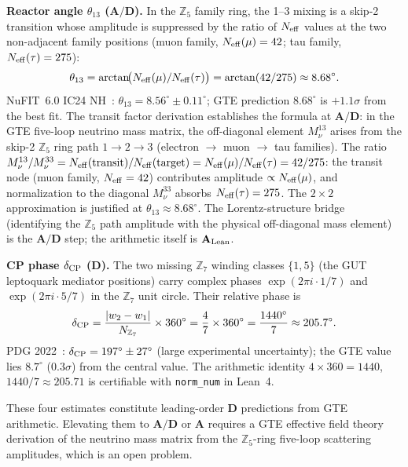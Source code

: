 \documentclass[11pt]{article}
\theoremstyle{remark}
\newcommand{\CatA}{\textbf{A}}
\newcommand{\CatAL}{\ensuremath{\textbf{A}_{\rm Lean}}}
\newcommand{\CatAD}{\textbf{A/D}}
\newcommand{\CatD}{\textbf{D}}
\begin{document}
\textbf{Reactor angle $\theta_{13}$ ($\CatAD$).}\;
In the $\mathbb{Z}_5$ family ring, the 1--3 mixing is a skip-2 transition whose
amplitude is suppressed by the ratio of $N_{\rm eff}$ values at the two
non-adjacent family positions (muon family, $N_{\rm eff}(\mu)=42$; tau family,
$N_{\rm eff}(\tau)=275$):
\begin{equation}
  \theta_{13} = \arctan\!\bigl(N_{\rm eff}(\mu)/N_{\rm eff}(\tau)\bigr)
              = \arctan(42/275) \approx 8.68^{\circ}.
  \label{eq:theta13}
\end{equation}
NuFIT~6.0 IC24 NH~\cite{NuFIT60}: $\theta_{13} = 8.56^{\circ} \pm 0.11^{\circ}$; GTE prediction $8.68^\circ$ is $+1.1\sigma$ from the best fit.
The transit factor derivation establishes the formula at $\CatAD$: in the GTE
five-loop neutrino mass matrix, the off-diagonal element $M_\nu^{13}$ arises from
the skip-2 $\mathbb{Z}_5$ ring path $1 \to 2 \to 3$ (electron $\to$ muon $\to$ tau
families).
The ratio $M_\nu^{13}/M_\nu^{33} = N_{\rm eff}(\text{transit})/N_{\rm eff}(\text{target})
= N_{\rm eff}(\mu)/N_{\rm eff}(\tau) = 42/275$: the transit node (muon family,
$N_{\rm eff} = 42$) contributes amplitude $\propto N_{\rm eff}(\mu)$, and normalization
to the diagonal $M_\nu^{33}$ absorbs $N_{\rm eff}(\tau) = 275$.
The $2\times 2$ approximation is justified at $\theta_{13} \approx 8.68^{\circ}$.
The Lorentz-structure bridge (identifying the $\mathbb{Z}_5$ path amplitude with the
physical off-diagonal mass element) is the $\CatAD$ step; the arithmetic itself is
$\CatAL$.

\textbf{CP phase $\delta_{\rm CP}$ ($\CatD$).}\;
The two missing $\mathbb{Z}_7$ winding classes $\{1,5\}$ (the GUT leptoquark
mediator positions) carry complex phases $\exp(2\pi i \cdot 1/7)$ and
$\exp(2\pi i \cdot 5/7)$ in the $\mathbb{Z}_7$ unit circle.
Their relative phase is
\begin{equation}
  \delta_{\rm CP}
    = \frac{|w_2 - w_1|}{N_{\mathbb{Z}_7}} \times 360^{\circ}
    = \frac{4}{7} \times 360^{\circ}
    = \frac{1440^{\circ}}{7}
    \approx 205.7^{\circ}.
  \label{eq:deltacp}
\end{equation}
PDG 2022~\cite{PDG2022}: $\delta_{\rm CP} = 197^{\circ} \pm 27^{\circ}$ (large
experimental uncertainty); the GTE value lies $8.7^{\circ}$ ($0.3\sigma$)
from the central value.
The arithmetic identity $4 \times 360 = 1440$, $1440/7 \approx 205.71$ is
certifiable with \texttt{norm\_num} in Lean~4.

These four estimates constitute leading-order $\CatD$ predictions from GTE
arithmetic.
Elevating them to $\CatAD$ or $\CatA$ requires a GTE effective field theory
derivation of the neutrino mass matrix from the $\mathbb{Z}_5$-ring
five-loop scattering amplitudes, which is an open problem.
\end{document}
